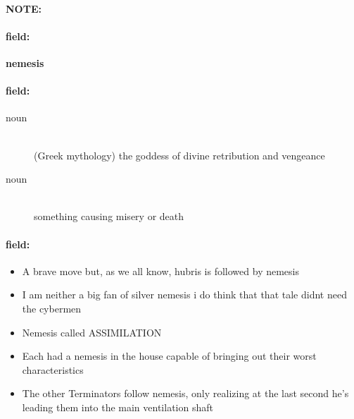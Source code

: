 \documentclass[12pt]{article}
\newenvironment{note}{\paragraph{NOTE:}}{}
\newenvironment{field}{\paragraph{field:}}{}
\begin{document}
\begin{note}
\begin{field}
\textbf{\large nemesis}
\end{field}


\begin{field}
\begin{description}
\item[noun] \hfill \\ 
(Greek mythology) the goddess of divine retribution and vengeance

\item[noun] \hfill \\ 
something causing misery or death

\end{description}
\end{field}

\begin{field}
\begin{itemize}
\item A brave move but, as we all know, hubris is followed by nemesis
\item I am neither a big fan of silver nemesis i do think that that tale didnt need the cybermen
\item Nemesis called ASSIMILATION
\item Each had a nemesis in the house capable of bringing out their worst characteristics
\item The other Terminators follow nemesis, only realizing at the last second he's leading them into the main ventilation shaft
\end{itemize}
\end{field}
\end{note}
\end{document}
